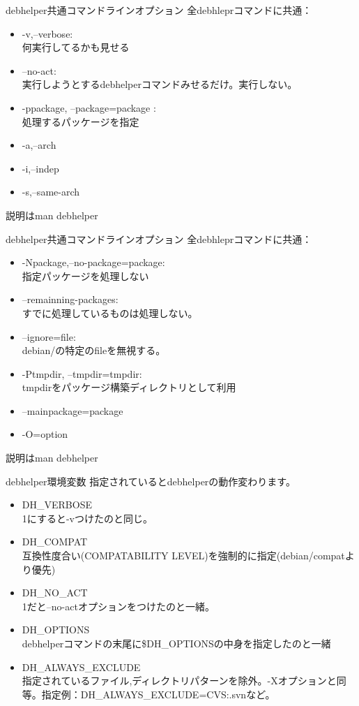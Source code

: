 \begin{frame}{debhelper共通コマンドラインオプション}
全debhleprコマンドに共通：
\begin{itemize}
\item -v,--verbose: \\何実行してるかも見せる
\item --no-act: \\実行しようとするdebhelperコマンドみせるだけ。実行しない。
\item -ppackage, --package=package : \\処理するパッケージを指定
\item -a,--arch
\item -i,--indep
\item -s,--same-arch
\end{itemize}
説明はman debhelper
\end{frame}
\begin{frame}{debhelper共通コマンドラインオプション}
全debhleprコマンドに共通：
\begin{itemize}
\item -Npackage,--no-package=package: \\指定パッケージを処理しない
\item --remainning-packages:\\
すでに処理しているものは処理しない。
\item --ignore=file:\\
debian/の特定のfileを無視する。
\item -Ptmpdir, --tmpdir=tmpdir:\\
tmpdirをパッケージ構築ディレクトリとして利用
\item --mainpackage=package
\item -O=option
\end{itemize}
説明はman debhelper
\end{frame}
\begin{frame}{debhelper環境変数}
指定されているとdebhelperの動作変わります。
\begin{itemize}
\item DH\_VERBOSE\\
1にすると-vつけたのと同じ。
\item DH\_COMPAT\\
互換性度合い(COMPATABILITY LEVEL)を強制的に指定(debian/compatより優先)
\item DH\_NO\_ACT\\
1だと--no-actオプションをつけたのと一緒。
\item DH\_OPTIONS\\
debhelperコマンドの末尾に\$DH\_OPTIONSの中身を指定したのと一緒
\item DH\_ALWAYS\_EXCLUDE\\
指定されているファイル,ディレクトリパターンを除外。-Xオプションと同等。指定例：DH\_ALWAYS\_EXCLUDE=CVS:.svnなど。
\end{itemize}
\end{frame}

